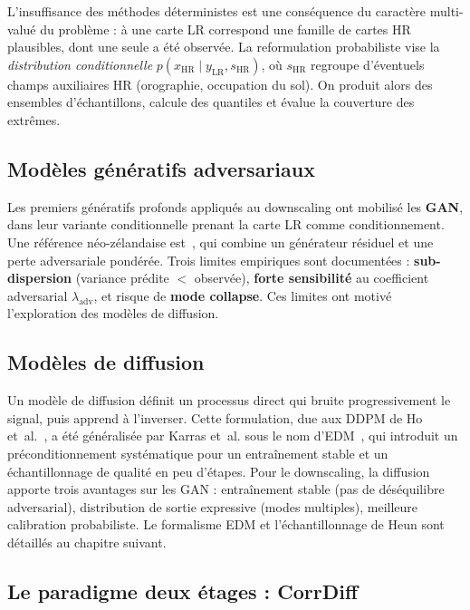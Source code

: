 \documentclass[14pt,a4paper,openany]{extreport}
\newcommand{\LR}{\ensuremath{\text{LR}}}
\newcommand{\HR}{\ensuremath{\text{HR}}}
\newcommand{\xHR}{\ensuremath{x_{\HR}}}
\newcommand{\yLR}{\ensuremath{y_{\LR}}}
\begin{document}
L'insuffisance des méthodes déterministes est une conséquence du caractère multi-valué du problème : à une carte LR correspond une famille de cartes HR plausibles, dont une seule a été observée. La reformulation probabiliste vise la \emph{distribution conditionnelle} $p(\xHR \mid \yLR, s_{\HR})$, où $s_{\HR}$ regroupe d'éventuels champs auxiliaires HR (orographie, occupation du sol). On produit alors des ensembles d'échantillons, calcule des quantiles et évalue la couverture des extrêmes.

\subsection{Modèles génératifs adversariaux}
\label{ssec:gan}

Les premiers génératifs profonds appliqués au downscaling ont mobilisé les \textbf{GAN}, dans leur variante conditionnelle prenant la carte LR comme conditionnement. Une référence néo-zélandaise est~\cite{rampal_cgan_2024}, qui combine un générateur résiduel et une perte adversariale pondérée. Trois limites empiriques sont documentées : \textbf{sub-dispersion} (variance prédite $<$ observée), \textbf{forte sensibilité} au coefficient adversarial $\lambda_{\mathrm{adv}}$, et risque de \textbf{mode collapse}. Ces limites ont motivé l'exploration des modèles de diffusion.\label{fig:subdispersion}

\subsection{Modèles de diffusion}
\label{ssec:diffusion}

Un modèle de diffusion définit un processus direct qui bruite progressivement le signal, puis apprend à l'inverser. Cette formulation, due aux DDPM de Ho et~al.~\cite{ho_ddpm_2020}, a été généralisée par Karras et~al. sous le nom d'EDM~\cite{karras_edm_2022}, qui introduit un préconditionnement systématique pour un entraînement stable et un échantillonnage de qualité en peu d'étapes. Pour le downscaling, la diffusion apporte trois avantages sur les GAN : entraînement stable (pas de déséquilibre adversarial), distribution de sortie expressive (modes multiples), meilleure calibration probabiliste. Le formalisme EDM et l'échantillonnage de Heun sont détaillés au chapitre suivant.

\subsection{Le paradigme deux étages : CorrDiff}
\label{ssec:corrdiff}
\end{document}
